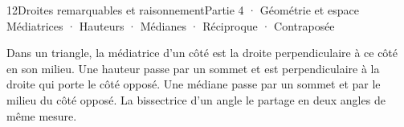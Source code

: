 \begin{ouverture}[raisonner]{12}{Droites remarquables et raisonnement}{Partie 4 · Géométrie et espace}
{Médiatrices · Hauteurs · Médianes · Réciproque · Contraposée}
\end{ouverture}
\pagestyle{otMain}\essentiel\fontsize{11}{15}\selectfont
{}\label{cours-12-1}
\begin{definition}Dans un triangle, la médiatrice d’un côté est la droite perpendiculaire à ce côté en son milieu. Une hauteur passe par un sommet et est perpendiculaire à la droite qui porte le côté opposé. Une médiane passe par un sommet et par le milieu du côté opposé. La bissectrice d’un angle le partage en deux angles de même mesure.\end{definition}
\label{fig-cours-12-1-cours-droites-remarquables}

